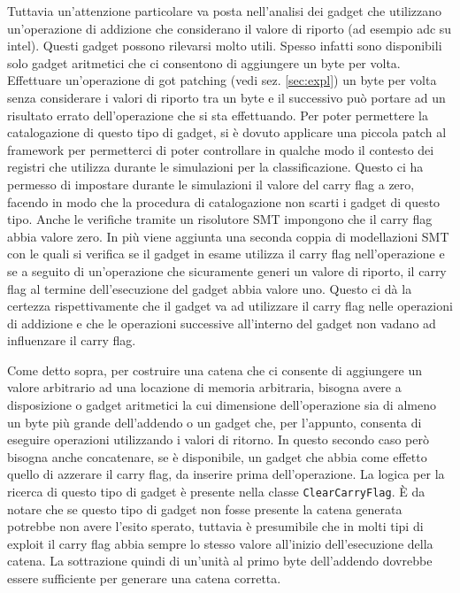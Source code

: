 Tuttavia un'attenzione particolare va posta nell'analisi dei gadget
che utilizzano un'operazione di addizione che considerano il valore di
riporto (ad esempio adc su intel). Questi gadget possono rilevarsi
molto utili. Spesso infatti sono disponibili solo gadget aritmetici
che ci consentono di aggiungere un byte per volta. Effettuare
un'operazione di got patching (vedi sez. \ref{sec:expl}) un
byte per volta senza considerare i valori di riporto tra un byte e il
successivo può portare ad un risultato errato dell'operazione che si
sta effettuando. Per poter permettere la catalogazione di questo
tipo di gadget, si è dovuto applicare una piccola patch al framework
per permetterci di poter controllare in qualche modo il contesto dei
registri che utilizza durante le simulazioni per la
classificazione. Questo ci ha permesso di impostare durante le
simulazioni il valore del carry flag a zero, facendo in modo che la
procedura di catalogazione non scarti i gadget di questo tipo. Anche
le verifiche tramite un risolutore SMT impongono che il carry flag
abbia valore zero. In più viene aggiunta una seconda coppia di
modellazioni SMT con le quali si verifica se il gadget in esame
utilizza il carry flag nell'operazione e se a seguito di un'operazione
che sicuramente generi un valore di riporto, il carry flag al termine
dell'esecuzione del gadget abbia valore uno. Questo ci dà la certezza
rispettivamente che il gadget va ad utilizzare il carry flag nelle
operazioni di addizione e che le operazioni successive all'interno del
gadget non vadano ad influenzare il carry flag.

Come detto sopra, per costruire una catena che ci consente di
aggiungere un valore arbitrario ad una locazione di memoria
arbitraria, bisogna avere a disposizione o gadget aritmetici la cui
dimensione dell'operazione sia di almeno un byte più grande
dell'addendo o un gadget che, per l'appunto, consenta di eseguire
operazioni utilizzando i valori di ritorno. In questo secondo caso
però bisogna anche concatenare, se è disponibile, un gadget che abbia
come effetto quello di azzerare il carry flag, da inserire prima
dell'operazione. La logica per la ricerca di questo tipo di gadget è
presente nella classe \lstinline{ClearCarryFlag}. È da notare che se
questo tipo di gadget non fosse presente la catena generata potrebbe
non avere l'esito sperato, tuttavia è presumibile che in molti tipi di
exploit il carry flag abbia sempre lo stesso valore all'inizio
dell'esecuzione della catena. La sottrazione quindi di un'unità al
primo byte dell'addendo dovrebbe essere sufficiente per generare una
catena corretta. 

